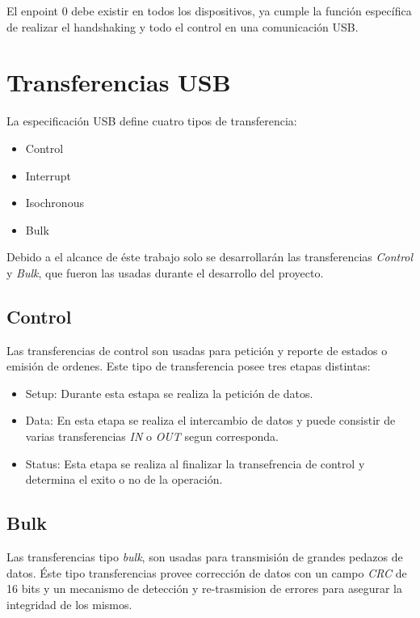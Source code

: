 El enpoint 0 debe existir en todos los dispositivos, ya cumple la funci\'on
espec\'ifica de realizar el handshaking y todo el control en una
comunicaci\'on USB. 


\section{Transferencias USB}
La especificaci\'on USB define cuatro tipos de transferencia:

\begin{itemize}
 \item Control
 \item Interrupt
 \item Isochronous 
 \item Bulk
\end{itemize}

Debido a el alcance de \'este trabajo solo se desarrollar\'an las
transferencias \emph{Control} y \emph{Bulk}, que fueron las usadas durante el
desarrollo del proyecto.


\subsection{Control}
Las transferencias de control son usadas para petici\'on y reporte de estados o
emisi\'on de ordenes. Este tipo de transferencia posee tres etapas distintas:

\begin{itemize}
 \item Setup:
		Durante esta estapa se realiza la petici\'on de datos.
 \item Data:
		En esta etapa se realiza el intercambio de datos y puede consistir de
varias transferencias \emph{IN} o \emph{OUT} segun corresponda. 
 \item Status:
		Esta etapa se realiza al finalizar la transefrencia de control y
determina el exito o no de la operaci\'on.
\end{itemize}


\subsection{Bulk}
Las transferencias tipo \emph{bulk}, son usadas para transmisi\'on de grandes
pedazos de datos. \'Este tipo transferencias provee correcci\'on de datos
con un campo \emph{CRC} de 16 bits y un mecanismo de detecci\'on y
re-trasmision de errores para asegurar la integridad de los mismos.\\

